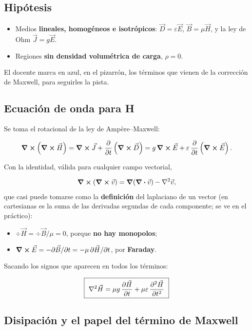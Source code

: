 \documentclass[12pt,a4paper]{article}
\begin{document}
\subsection{Hipótesis}

\begin{itemize}
  \item Medios \textbf{lineales, homogéneos e isotrópicos}: $\vec D = \varepsilon\vec E$,
  $\vec B = \mu\vec H$, y la ley de Ohm $\vec J = g\vec E$.
  \item Regiones \textbf{sin densidad volumétrica de carga}, $\rho = 0$.
\end{itemize}

El docente marca en azul, en el pizarrón, los términos que vienen de la
corrección de Maxwell, para seguirles la pista.

\subsection{Ecuación de onda para H}

Se toma el rotacional de la ley de Ampère--Maxwell:

\[
\curl(\curl\vec H) = \curl\vec J + \pdv{t}\left(\curl\vec D\right)
= g\,\curl\vec E + \varepsilon\,\pdv{t}\left(\curl\vec E\right).
\]

Con la identidad, válida para cualquier campo vectorial,

\[
\curl(\curl\vec v) = \grad(\div\vec v) - \laplacian\vec v,
\]
que casi puede tomarse como la \textbf{definición} del laplaciano de un vector (en
cartesianas es la suma de las derivadas segundas de cada componente; se ve en
el práctico):

\begin{itemize}
  \item $\div\vec H = \div\vec B/\mu = 0$, porque \textbf{no hay monopolos};
  \item $\curl\vec E = -\partial\vec B/\partial t = -\mu\,\partial\vec H/\partial t$,
  por \textbf{Faraday}.
\end{itemize}

Sacando los signos que aparecen en todos los términos:

\begin{keybox}
\[
\boxed{\ \laplacian\vec H = \mu g\,\pdv{\vec H}{t} + \mu\varepsilon\,\pdv[2]{\vec H}{t}\ }
\]
\end{keybox}

\subsection{Disipación y el papel del término de Maxwell}
\end{document}
